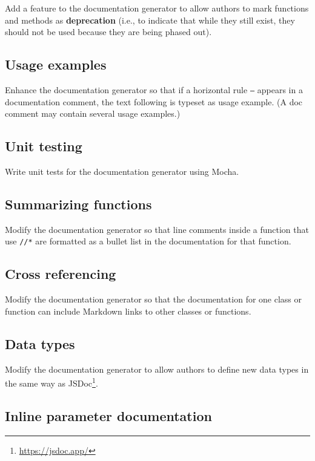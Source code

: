 \documentclass[krantzl]{krantz}
\newcommand{\glossref}[1]{\textbf{#1}}
\newcommand{\hreffoot}[2]{{#1}\footnote{\href{#2}{#2}}}
\begin{document}
Add a feature to the documentation generator
to allow authors to mark functions and methods as \glossref{deprecation}
(i.e., to indicate that while they still exist,
they should not be used because they are being phased out).

\subsection*{Usage examples}


Enhance the documentation generator so that
if a horizontal rule \texttt{---} appears in a documentation comment,
the text following is typeset as usage example.
(A doc comment may contain several usage examples.)

\subsection*{Unit testing}


Write unit tests for the documentation generator using Mocha.

\subsection*{Summarizing functions}


Modify the documentation generator so that line comments inside a function that use \texttt{//*}
are formatted as a bullet list in the documentation for that function.

\subsection*{Cross referencing}


Modify the documentation generator so that
the documentation for one class or function
can include Markdown links to other classes or functions.

\subsection*{Data types}


Modify the documentation generator to allow authors to define new data types
in the same way as \hreffoot{JSDoc}{https://jsdoc.app/}.

\subsection*{Inline parameter documentation}
\end{document}
